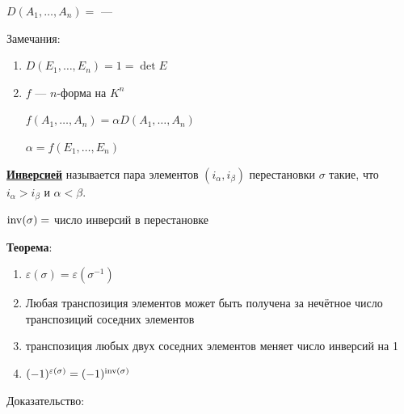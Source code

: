 \(D(A_1,\ldots,A_n)  = \)  --- 


Замечания:
\begin{enumerate}
    \item \(D(E_1, \ldots, E_n) = 1 = \det E\)
    \item \(f\) --- \(n\)-форма на \(K^n\)

          \(f(A_1, \ldots, A_n) = \alpha D(A_1, \ldots, A_n)\)

          \(\alpha = f(E_1, \ldots, E_n)\)
\end{enumerate}

\uline{\textbf{Инверсией}} называется пара элементов \((i_\alpha,i_\beta) \) перестановки \(\sigma\) такие, что \(i_\alpha> i_\beta\) и \(\alpha<\beta\).

\(\operatorname{inv}(\sigma) = \) число инверсий в перестановке

\textbf{Теорема}:

\begin{enumerate}
    \item \(\varepsilon(\sigma) = \varepsilon(\sigma^{-1})\)
    \item Любая транспозиция элементов может быть получена за нечётное число транспозиций соседних элементов
    \item транспозиция любых двух соседних элементов меняет число инверсий на 1
    \item \((-1)^{\varepsilon(\sigma)}=(-1)^{\operatorname{inv}(\sigma)}\)
\end{enumerate}

Доказательство:

